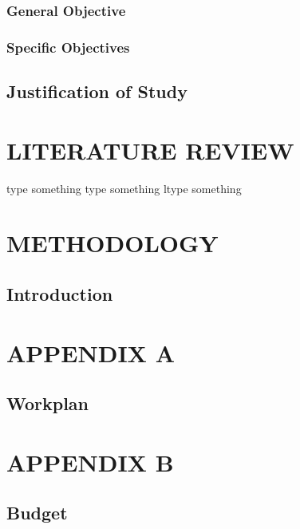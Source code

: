 \documentclass[12pt]{report}
\numberwithin{equation}{section}
\begin{document}
		\subsection{General Objective}
		
		\subsection{ Specific Objectives}
	
		\section{Justification of Study}
		 
		\chapter{ LITERATURE REVIEW}
		type something \cite{Thomas2021} type something \cite{Itam2022}ltype something
		\nopagebreak
		\chapter{METHODOLOGY}
		\section{Introduction}
		 
		
		
		
		
		\newpage
		
		\chapter*{APPENDIX A}
		\section*{Workplan}
		
		
		
		
		\chapter*{APPENDIX B}
		\section*{Budget}
		\newpage
		
		 
	
\end{document}
